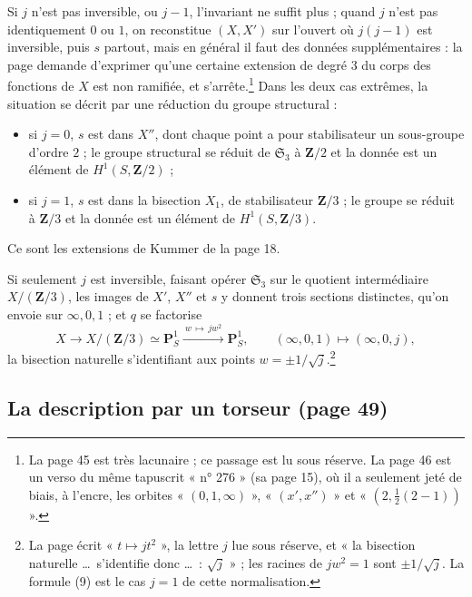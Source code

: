 \documentclass[11pt,a4paper]{article}
\begin{document}
Si $j$ n'est pas inversible, ou $j - 1$, l'invariant ne suffit plus ; quand
$j$ n'est pas identiquement $0$ ou $1$, on reconstitue $(X, X')$ sur l'ouvert
où $j(j-1)$ est inversible, puis $s$ partout, mais en général il faut des données
supplémentaires : la page demande d'exprimer qu'une certaine extension de
degré $3$ du corps des fonctions de $X$ est non ramifiée, et s'arrête.\footnote{La
page 45 est très lacunaire ; ce passage est lu sous réserve. La
page 46 est un verso du même tapuscrit « n° 276 » (sa page 15), où il a seulement
jeté de biais, à l'encre, les orbites « $(0, 1, \infty)$ », « $(x', x'')$ » et
« $(2, \frac12(2-1))$ ».} Dans les deux cas extrêmes, la situation se décrit
par une réduction du groupe structural :
\begin{itemize}
\item si $j = 0$, $s$ est dans $X''$, dont chaque point a pour stabilisateur
un sous-groupe d'ordre $2$ ; le groupe structural se réduit de $\mathfrak{S}_3$
à $\mathbf{Z}/2$ et la donnée est un élément de $H^1(S, \mathbf{Z}/2)$ ;
\item si $j = 1$, $s$ est dans la bisection $X_1$, de stabilisateur
$\mathbf{Z}/3$ ; le groupe se réduit à $\mathbf{Z}/3$ et la donnée est un
élément de $H^1(S, \mathbf{Z}/3)$.
\end{itemize}
Ce sont les extensions de Kummer de la page 18.

Si seulement $j$ est inversible, faisant opérer $\mathfrak{S}_3$ sur le
quotient intermédiaire $X/(\mathbf{Z}/3)$, les images de $X'$, $X''$ et $s$ y
donnent trois sections distinctes, qu'on envoie sur $\infty, 0, 1$ ; et $q$ se
factorise
\[
X \longrightarrow X/(\mathbf{Z}/3) \simeq \mathbf{P}^1_S
\xrightarrow{\ w \,\mapsto\, j w^2\ } \mathbf{P}^1_S,
\qquad (\infty, 0, 1) \mapsto (\infty, 0, j),
\]
la bisection naturelle s'identifiant aux points $w = \pm 1/\sqrt{j}$.\footnote{La
page écrit « $t \mapsto jt^2$ », la lettre $j$ lue sous réserve, et « la
bisection naturelle \ldots\ s'identifie donc \ldots\ : $\sqrt{j}$ » ; les
racines de $jw^2 = 1$ sont $\pm 1/\sqrt{j}$. La formule (9) est le cas $j = 1$
de cette normalisation.}

\subsection*{La description par un torseur (page 49)}
\end{document}
